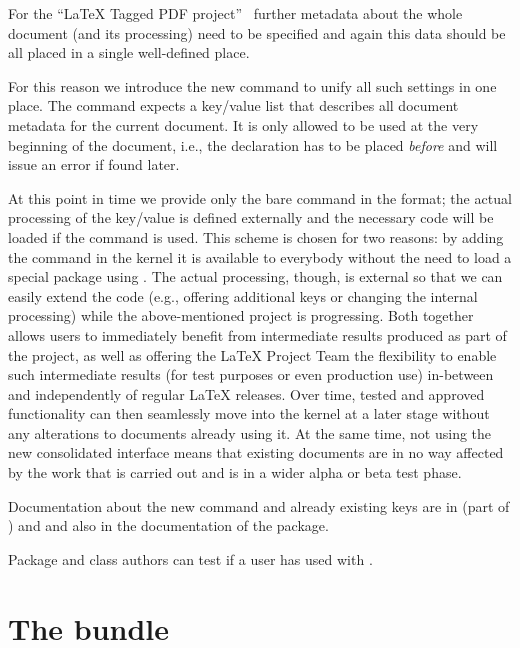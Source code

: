 \documentclass{ltnews}
\begin{document}
For the \enquote{\LaTeX{} Tagged PDF project}~\cite{35:blueprint}
further metadata about the whole document (and its processing) need to
be specified and again this data should be all placed in a single
well-defined place.

For this reason we introduce the new command  to
unify all such settings in one place.  The command expects a key/value
list that describes all document metadata for the current document. It
is only allowed to be used at the very beginning of the document,
i.e., the declaration has to be placed \emph{before}
 and will issue an error if found later.


At this point in time we provide only the bare command in the format;
the actual processing of the key/value is defined externally and the
necessary code will be loaded if the command is used. This scheme is
chosen for two reasons: by adding the command in the kernel it is
available to everybody without the need to load a special package
using . The actual processing, though, is external
so that we can easily extend the code (e.g., offering additional keys
or changing the internal processing) while the above-mentioned project
is progressing. Both together allows users to immediately benefit from
intermediate results produced as part of the project, as well as
offering the \LaTeX{} Project Team the flexibility to enable such
intermediate results (for test purposes or even production use)
in-between and independently of regular \LaTeX{} releases. Over time,
tested and approved functionality can then seamlessly move into the
kernel at a later stage without any alterations to documents already
using it. At the same time, not using the new consolidated interface
means that existing documents are in no way affected by the work that
is carried out and is in a wider alpha or beta test phase.

Documentation about the new command and
already existing keys are in  (part of )  and 
and also in the documentation of the  package.

Package and class authors can test if a user has used 
with .


\section{The  bundle}
\end{document}
